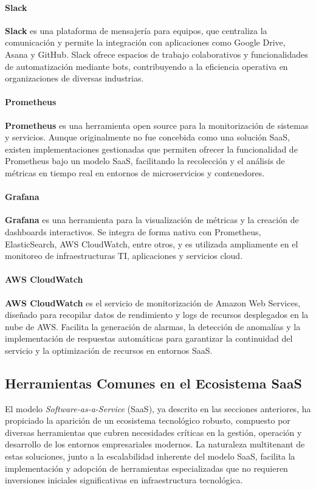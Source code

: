 {            \paragraph{Slack} \textbf{Slack} es una plataforma de mensajería para equipos, que centraliza la comunicación y permite la integración con aplicaciones como Google Drive, Asana y GitHub. Slack ofrece espacios de trabajo colaborativos y funcionalidades de automatización mediante bots, contribuyendo a la eficiencia operativa en organizaciones de diversas industrias.
            
            \paragraph{Prometheus} \textbf{Prometheus} es una herramienta open source para la monitorización de sistemas y servicios. Aunque originalmente no fue concebida como una solución SaaS, existen implementaciones gestionadas que permiten ofrecer la funcionalidad de Prometheus bajo un modelo SaaS, facilitando la recolección y el análisis de métricas en tiempo real en entornos de microservicios y contenedores.
            
            \paragraph{Grafana} \textbf{Grafana} es una herramienta para la visualización de métricas y la creación de dashboards interactivos. Se integra de forma nativa con Prometheus, ElasticSearch, AWS CloudWatch, entre otros, y es utilizada ampliamente en el monitoreo de infraestructuras TI, aplicaciones y servicios cloud.
            
            \paragraph{AWS CloudWatch} \textbf{AWS CloudWatch} es el servicio de monitorización de Amazon Web Services, diseñado para recopilar datos de rendimiento y logs de recursos desplegados en la nube de AWS. Facilita la generación de alarmas, la detección de anomalías y la implementación de respuestas automáticas para garantizar la continuidad del servicio y la optimización de recursos en entornos SaaS.
            
        \subsection{Herramientas Comunes en el Ecosistema SaaS}
            El modelo \textit{Software-as-a-Service} (SaaS), ya descrito en las secciones anteriores, ha propiciado la aparición de un ecosistema tecnológico robusto, compuesto por diversas herramientas que cubren necesidades críticas en la gestión, operación y desarrollo de los entornos empresariales modernos. La naturaleza multitenant de estas soluciones, junto a la escalabilidad inherente del modelo SaaS, facilita la implementación y adopción de herramientas especializadas que no requieren inversiones iniciales significativas en infraestructura tecnológica.
            
}
